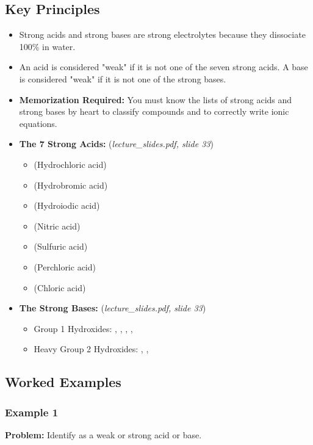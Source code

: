 \documentclass{article}
\begin{document}
\subsection{Key Principles}
\begin{itemize}
    \item Strong acids and strong bases are strong electrolytes because they dissociate 100\% in water.
    \item An acid is considered "weak" if it is not one of the seven strong acids. A base is considered "weak" if it is not one of the strong bases.
    \item \textbf{Memorization Required:} You must know the lists of strong acids and strong bases by heart to classify compounds and to correctly write ionic equations.
    \item \textbf{The 7 Strong Acids:} (\textit{lecture\_slides.pdf, slide 33})
        \begin{itemize}
            \item {} (Hydrochloric acid)
            \item {} (Hydrobromic acid)
            \item {} (Hydroiodic acid)
            \item {} (Nitric acid)
            \item {} (Sulfuric acid)
            \item {} (Perchloric acid)
            \item {} (Chloric acid)
        \end{itemize}
    \item \textbf{The Strong Bases:} (\textit{lecture\_slides.pdf, slide 33})
        \begin{itemize}
            \item Group 1 Hydroxides: , , , , 
            \item Heavy Group 2 Hydroxides: , , 
        \end{itemize}
\end{itemize}

\subsection{Worked Examples}
\subsubsection{Example 1}
\textbf{Problem:} Identify  as a weak or strong acid or base.
\end{document}
